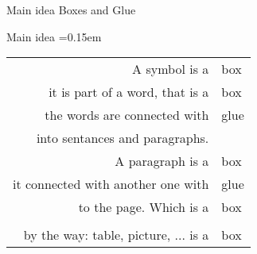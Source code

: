 \graphicspath{{sec03/images/}{sec03/code/s2/}}
\lstset{inputpath=sec03/code/s2/}

\begin{frame}[fragile]{Main idea}\relax
 \centering \Huge {\csk Boxes} and {\csk Glue}
     
\end{frame}

\begin{frame}{Main idea}\relax
\centering \large
\tabcolsep=0.15em
\begin{tabular}{r>{\csk}l}
     A symbol is a & box\\
     it is part of a word, that is a & box\\ 
     the words are connected with & glue\\ 
     into sentances and paragraphs.&\\ 
     A paragraph is a & box\\
     it connected with another one with & glue\\
     to the page. Which is a & box\\
     &\\ 
     by the way: table, picture, ... is a & box 
\end{tabular}

\end{frame}

